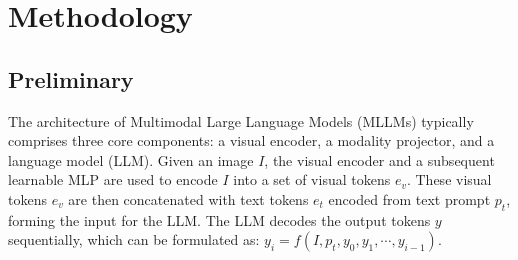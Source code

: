 \vspace{-1mm}
\section{Methodology}
\vspace{-1mm}
\subsection{Preliminary}
\label{sec:preliminary}
\vspace{-2mm}
 The architecture of Multimodal Large Language Models (MLLMs) typically comprises three core components: a visual encoder, a modality projector, and a language model (LLM). Given an image $I$, the visual encoder and a subsequent learnable MLP are used to encode $I$ into a set of visual tokens $e_v$. These visual tokens $e_v$ are then concatenated with text tokens $e_t$ encoded from text prompt $p_t$, forming the input for the LLM. The LLM decodes the output tokens $y$ sequentially, which can be formulated as:
    $y_i = f(I, p_t, y_0, y_1, \cdots, y_{i-1}).$


\vspace{-1mm}
